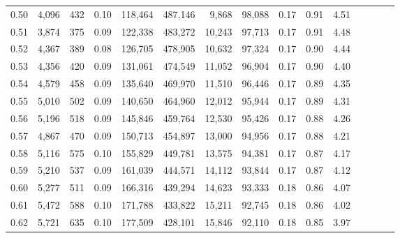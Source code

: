 \begin{tabular}{rrrcrrrrrrrrrrr}
0.50 &   4,096 &    432 &                                       0.10 &  118,464 &  487,146 &    9,868 &   98,088 &  0.17 &  0.91 &                         4.51 \\
0.51 &   3,874 &    375 &                                       0.09 &  122,338 &  483,272 &   10,243 &   97,713 &  0.17 &  0.91 &                         4.48 \\
0.52 &   4,367 &    389 &                                       0.08 &  126,705 &  478,905 &   10,632 &   97,324 &  0.17 &  0.90 &                         4.44 \\
0.53 &   4,356 &    420 &                                       0.09 &  131,061 &  474,549 &   11,052 &   96,904 &  0.17 &  0.90 &                         4.40 \\
0.54 &   4,579 &    458 &                                       0.09 &  135,640 &  469,970 &   11,510 &   96,446 &  0.17 &  0.89 &                         4.35 \\
0.55 &   5,010 &    502 &                                       0.09 &  140,650 &  464,960 &   12,012 &   95,944 &  0.17 &  0.89 &                         4.31 \\
0.56 &   5,196 &    518 &                                       0.09 &  145,846 &  459,764 &   12,530 &   95,426 &  0.17 &  0.88 &                         4.26 \\
0.57 &   4,867 &    470 &                                       0.09 &  150,713 &  454,897 &   13,000 &   94,956 &  0.17 &  0.88 &                         4.21 \\
0.58 &   5,116 &    575 &                                       0.10 &  155,829 &  449,781 &   13,575 &   94,381 &  0.17 &  0.87 &                         4.17 \\
0.59 &   5,210 &    537 &                                       0.09 &  161,039 &  444,571 &   14,112 &   93,844 &  0.17 &  0.87 &                         4.12 \\
0.60 &   5,277 &    511 &                                       0.09 &  166,316 &  439,294 &   14,623 &   93,333 &  0.18 &  0.86 &                         4.07 \\
0.61 &   5,472 &    588 &                                       0.10 &  171,788 &  433,822 &   15,211 &   92,745 &  0.18 &  0.86 &                         4.02 \\
0.62 &   5,721 &    635 &                                       0.10 &  177,509 &  428,101 &   15,846 &   92,110 &  0.18 &  0.85 &                         3.97 \\

\end{tabular}
